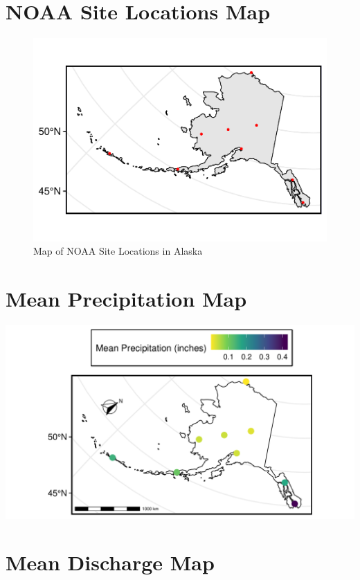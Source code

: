 \documentclass[12pt,]{article}
\begin{document}
\hypertarget{noaa-site-locations-map}{%
\section{NOAA Site Locations Map}\label{noaa-site-locations-map}}

\begin{figure}
\centering
\includegraphics{Project_Report_v2_files/figure-latex/unnamed-chunk-4-1.pdf}
\caption{Map of NOAA Site Locations in Alaska}
\end{figure}

\hypertarget{mean-precipitation-map}{%
\section{Mean Precipitation Map}\label{mean-precipitation-map}}

\includegraphics{Project_Report_v2_files/figure-latex/unnamed-chunk-5-1.pdf}
\newpage

\hypertarget{mean-discharge-map}{%
\section{Mean Discharge Map}\label{mean-discharge-map}}
\end{document}
